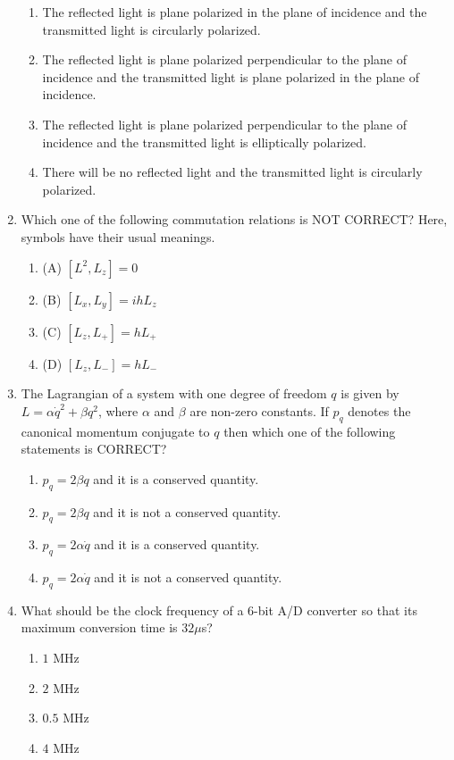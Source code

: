\documentclass[journal]{IEEEtran}
\theoremstyle{remark}
\begin{document}
\begin{enumerate}
\begin{enumerate}
    \item The reflected light is plane polarized in the plane of incidence and the transmitted light is circularly polarized.
    \item The reflected light is plane polarized perpendicular to the plane of incidence and the transmitted light is plane polarized in the plane of incidence.
    \item The reflected light is plane polarized perpendicular to the plane of incidence and the transmitted light is elliptically polarized.
    \item There will be no reflected light and the transmitted light is circularly polarized.
\end{enumerate}

\item Which one of the following commutation relations is NOT CORRECT? Here, symbols have their usual meanings.
\begin{enumerate}
    \item (A) $[L^2, L_z] = 0$
    \item (B) $[L_x, L_y] = ihL_z$
    \item (C) $[L_z, L_+] = hL_+$
    \item (D) $[L_z, L_-] = hL_-$
\end{enumerate}
\item The Lagrangian of a system with one degree of freedom $q$ is given by $L = \alpha \dot{q}^2 + \beta q^2$, where $\alpha$ and $\beta$ are non-zero constants. If $p_q$ denotes the canonical momentum conjugate to $q$ then which one of the following statements is CORRECT?
\begin{enumerate}
    \item $p_q = 2\beta q$ \quad and it is a conserved quantity.
    \item $p_q = 2\beta q$ \quad and it is not a conserved quantity.
    \item $p_q = 2\alpha \dot{q}$ \quad and it is a conserved quantity.
    \item $p_q = 2\alpha \dot{q}$ \quad and it is not a conserved quantity.
\end{enumerate} 
\item What should be the clock frequency of a $6$-bit A/D converter so that its maximum conversion time is $32 \mu$s?
\begin{multicols}{4}
\begin{enumerate}
    \item  $1$ MHz
    \item  $2$ MHz
    \item  $0.5$ MHz
    \item  $4$ MHz
\end{enumerate}
\end{multicols}


\end{enumerate}
\end{document}

